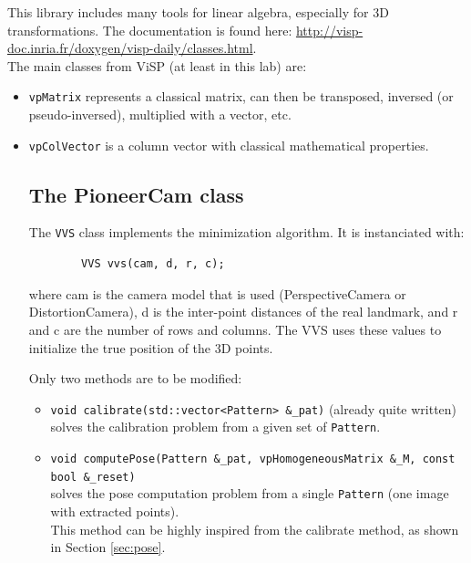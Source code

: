 \documentclass{ecnreport}
\begin{document}
This library includes many tools for linear algebra, especially for 3D transformations. 
The documentation is found here: \url{http://visp-doc.inria.fr/doxygen/visp-daily/classes.html}.\\
The main classes from ViSP (at least in this lab) are:
\begin{itemize}
\item \texttt{vpMatrix} represents a classical matrix, can then be transposed, inversed (or pseudo-inversed), multiplied with a vector, etc.
\item \texttt{vpColVector} is a column vector with classical mathematical properties.

 \subsection{The PioneerCam class}
 
 The \texttt{VVS} class implements the minimization algorithm. It is instanciated with:
 \begin{center}\cppstyle
\begin{lstlisting}
        VVS vvs(cam, d, r, c);
\end{lstlisting}
\end{center}where cam is the camera model that is used (PerspectiveCamera or DistortionCamera), d is the inter-point distances of the real landmark, and r and c are the number of rows and columns. The VVS uses these values to initialize the true position of the 3D points.

Only two methods are to be modified:
\begin{itemize}
    \item \texttt{void calibrate(std::vector<Pattern> \&\_pat)} (already quite written)\\ solves the calibration problem from a given set of \texttt{Pattern}. 
    \item \texttt{void computePose(Pattern \&\_pat, vpHomogeneousMatrix \&\_M, const bool \&\_reset)} \\ 
    solves the pose computation problem from a single \texttt{Pattern} (one image with extracted points).\\ This method can be highly inspired from the calibrate method, as shown in Section \ref{sec:pose}.
\end{itemize}


\end{itemize}
\end{document}
